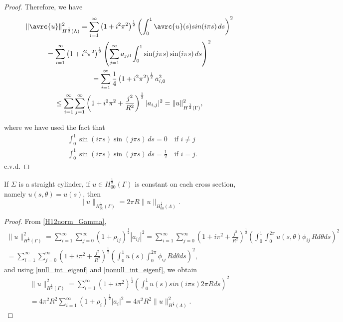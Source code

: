 \begin{proof}
Therefore, we have
\begin{multline*}
\|\avrc{u}\|^2_{H^{\frac 12}(\Lambda)}=
\sum_{i=1}^{\infty}\left( 1+ i^2\pi^2\right)^{\frac 12}\left( \int_0^1 \avrc{u}(s) sin(i\pi s)\, ds \right)^2\\
= \sum_{i=1}^{\infty} \left( 1+ i^2\pi^2\right)^{\frac 12}\left( \sum_{j=1}^\infty a_{j,0}\int_0^1 \sin(j\pi s) \sin(i\pi s) \, ds  \right)^2\\
= \sum_{i=1}^{\infty} \frac 14 \left( 1+ i^2\pi^2\right)^{\frac 12}a_{i,0}^2\\
\leq \sum_{i=1}^{\infty} \sum_{j=1}^{\infty}  \left( 1+ i^2\pi^2 + \frac{j^2}{R^2}\right)^{\frac 12} |a_{i,j}|^2 =\|u\|^2_{H^{\frac 12}(\Gamma)},
\end{multline*}

where we have used the fact that
\begin{eqnarray*}
&\int_0^1 \sin(i\pi s) \sin(j\pi s)\, ds=0 \quad \text{if $i\neq j$}\\
&\int_0^1 \sin(i\pi s) \sin(j\pi s)\, ds=\frac 12 \quad \text{if $i =j$}.
\end{eqnarray*}
\hspace*{0.9\textwidth} c.v.d.
\end{proof}

\begin{lemma}\label{lemma:H12norm_avrc}
If $\Sigma$ is a straight cylinder, 
if $u\in H^{\frac 12}_{00}(\Gamma)$ is constant on each cross section, namely $u(s,\theta)=u(s)$, then 
\begin{equation*}
\|u\|_{H^{\frac 12}_{00}(\Gamma)}=2\pi R \|u\|_{H^{\frac 12}_{00}(\Lambda)}.
\end{equation*}
\end{lemma}
\begin{proof}

From \eqref{H12norm_Gamma},
\begin{multline*}
\|u\|^2_{H^{\frac 12}(\Gamma)}=\sum_{i=1}^{\infty}\sum_{j=0}^{\infty} \left( 1+ \rho_{ij}\right)^{\frac 12}|a_{ij}|^2
=\sum_{i=1}^{\infty}\sum_{j=0}^{\infty} \left(  1+ i\pi ^2+\frac{j^2}{R^2}\right)^{\frac 12}\left( \int _0^1\int _0^{2\pi} u(s,\theta )\phi_{ij}\, R d\theta ds \right)^2\\
=\sum_{i=1}^{\infty}\sum_{j=0}^{\infty} \left(  1+ i\pi ^2+\frac{j^2}{R^2}\right)^{\frac 12}\left( \int _0^1 u(s) \int _0^{2\pi} \phi_{ij}\, R d\theta ds \right)^2,
\end{multline*}
and using \eqref{null_int_eigenf} and \eqref{nonull_int_eigenf}, we obtain
\begin{multline*}
\|u\|^2_{H^{\frac 12}(\Gamma)}=
\sum_{i=1}^{\infty}\left( 1+ i\pi ^2\right)^{\frac 12}\left(\int _0^1 u(s )sin (i\pi s) 2\pi R ds\right)^2\\
=4\pi ^2 R^2 \sum_{i=1}^{\infty}\left( 1+ \rho _i\right)^{\frac 12}|a_i|^2 = 4\pi ^2 R^2  \|u\|^2_{H^{\frac 12}(\Lambda)}.
\end{multline*}
\end{proof}

